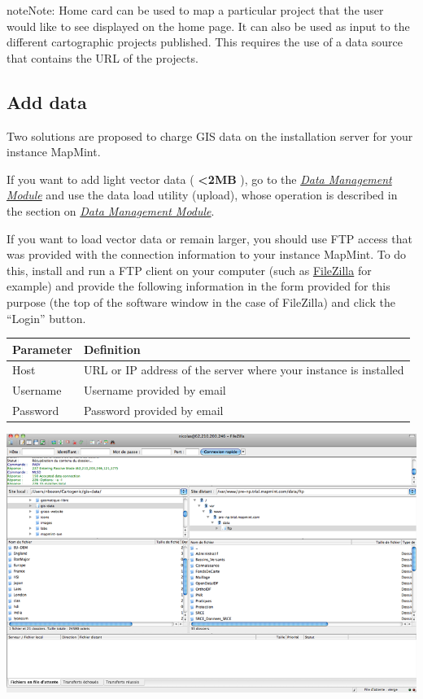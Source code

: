\documentclass[letterpaper,10pt,english]{sphinxmanual}
\begin{document}
\begin{notice}{note}{Note:}
Home card can be used to map a particular project that the user would like to see displayed on the home page. It can also be used as input to the different cartographic projects published. This requires the use of a data source that contains the URL of the projects.
\end{notice}


\subsection{Add data}
\label{introduction/usemapmint:ajouter-des-donnees}
Two solutions are proposed to charge GIS data on the installation server for your instance MapMint.

If you want to add light vector data ( \textbf{\textless{}2MB} ), go to the {\hyperref[data/index::doc]{\emph{\emph{Data Management Module}}}} and use the data load utility (upload), whose operation is described in the section on {\hyperref[data/index::doc]{\emph{\emph{Data Management Module}}}}.

If you want to load vector data or remain larger, you should use FTP access that was provided with the connection information to your instance MapMint. To do this, install and run a FTP client on your computer (such as \href{https://filezilla-project.org/}{FileZilla} for example) and provide the following information in the form provided for this purpose (the top of the software window in the case of FileZilla) and click the ``Login'' button.

\begin{tabulary}{\linewidth}{|L|L|}
\hline

\textbf{Parameter}
 & 
\textbf{Definition}
\\
\hline
Host
 & 
URL or IP address of the server where your instance is installed
\\
\hline
Username
 & 
Username provided by email
\\
\hline
Password
 & 
Password provided by email
\\
\hline\end{tabulary}


\includegraphics{upload-ftp.png}
\end{document}
